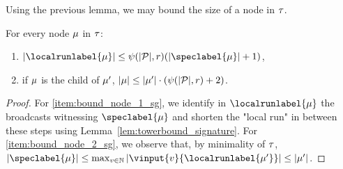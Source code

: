 


Using the previous lemma, we may bound the size of a node in $\tau$.

\begin{lemma}
\label{lem:bounds_tree_sg}
For every node $\mu$ in $\tau$: \begin{enumerate}
\item \label{item:bound_node_1_sg} $\size{\localrunlabel{\node}} \leq \towerfun(\size{\prot}, r) (\size{\speclabel{\node}}+1)$,
\item \label{item:bound_node_2_sg} if $\mu$ is the child of $\mu'$, $|\mu| \leq |\mu'| \cdot (\psi(|\mathcal{P}|,r)+2)$.
\end{enumerate} 
\end{lemma}
\begin{proof}
For \ref{item:bound_node_1_sg}, we identify in $\localrunlabel{\node}$ the broadcasts witnessing $\speclabel{\node}$ and shorten the "local run" in between these steps using Lemma~\ref{lem:towerbound_signature}.
For \ref{item:bound_node_2_sg}, we observe that, by minimality of $\tau$, $\size{\speclabel{\node}} \leq \max_{v \in \nats} \size{\vinput{v}{\localrunlabel{\node'}}} \leq \size{\node'}$.  
\end{proof}


